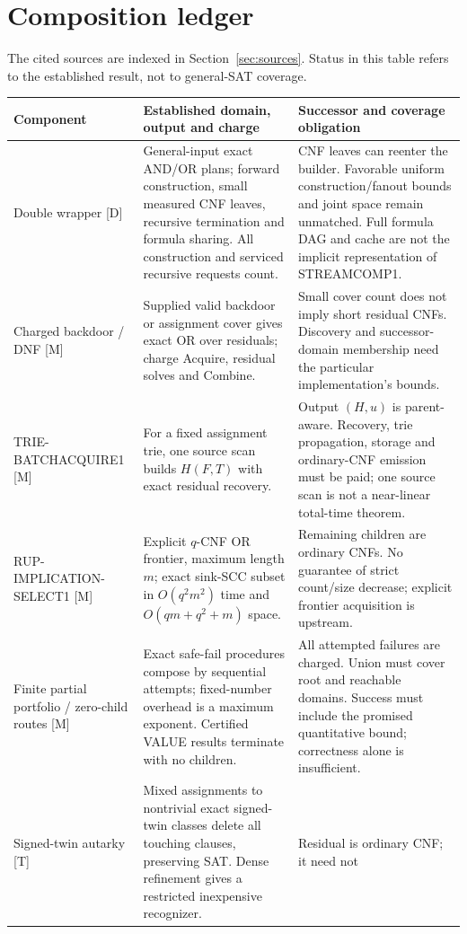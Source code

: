 \documentclass[11pt]{article}
\begin{document}
\section{Composition ledger}
The cited sources are indexed in Section~\ref{sec:sources}. Status in this
table refers to the established result, not to general-SAT coverage.
\small
\begin{longtable}{p{}p{}p{}}
\toprule Component & Established domain, output and charge & Successor and coverage obligation \\
\midrule\endhead
Double wrapper [D] & General-input exact AND/OR plans; forward construction,
small measured CNF leaves, recursive termination and formula sharing.
All construction and serviced recursive requests count. & CNF leaves can
reenter the builder. Favorable uniform construction/fanout bounds and joint
space remain unmatched. Full formula DAG and cache are not the implicit
representation of STREAMCOMP1. \\
Charged backdoor / DNF [M] & Supplied valid backdoor or assignment cover gives
exact OR over residuals; charge Acquire, residual solves and Combine. &
Small cover count does not imply short residual CNFs. Discovery and
successor-domain membership need the particular implementation's bounds. \\
TRIE-BATCHACQUIRE1 [M] & For a fixed assignment trie, one source scan builds
$H(F,T)$ with exact residual recovery. & Output $(H,u)$ is parent-aware.
Recovery, trie propagation, storage and ordinary-CNF emission must be paid;
one source scan is not a near-linear total-time theorem. \\
RUP-IMPLICATION-SELECT1 [M] & Explicit $q$-CNF OR frontier, maximum length $m$;
exact sink-SCC subset in $O(q^2m^2)$ time and
$O(qm+q^2+m)$ space. & Remaining children are ordinary CNFs. No guarantee
of strict count/size decrease; explicit frontier acquisition is upstream. \\
Finite partial portfolio / zero-child routes [M] & Exact safe-fail procedures
compose by sequential attempts; fixed-number overhead is a maximum exponent.
Certified VALUE results terminate with no children. & All attempted failures
are charged. Union must cover root and reachable domains. Success must
include the promised quantitative bound; correctness alone is insufficient. \\
Signed-twin autarky [T] & Mixed assignments to nontrivial exact signed-twin
classes delete all touching clauses, preserving SAT. Dense refinement gives
a restricted inexpensive recognizer. & Residual is ordinary CNF; it need not

\end{longtable}
\end{document}
